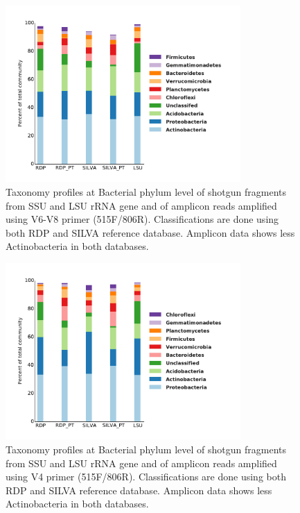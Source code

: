 \documentclass[12pt]{article}
\begin{document}
\begin{figure}[tbph!]
  \centering
  \includegraphics[width=0.8\textwidth]{figs/V6to8_SB1_taxa}

  \caption[Taxonomy profiles at Bacterial phylum level of shotgun
  fragments and of amplicon reads amplified using V6-V8
  primer]{Taxonomy profiles at Bacterial phylum level of shotgun
  fragments from SSU and LSU rRNA gene and of amplicon reads amplified
  using V6-V8 primer (515F/806R). Classifications are done using both
  RDP and SILVA reference database. Amplicon data shows less
  Actinobacteria in both databases.}

  \label{fig:V6to8_SB1_taxa}
\end{figure}

\begin{figure}[tbph!]
  \centering
  \includegraphics[width=0.8\textwidth]{figs/V4_M1_taxa}

  \caption[Taxonomy profiles at Bacterial phylum level of shotgun
  fragments and of amplicon reads amplified using V4 primer]{Taxonomy
  profiles at Bacterial phylum level of shotgun fragments from SSU and
  LSU rRNA gene and of amplicon reads amplified using V4 primer
  (515F/806R). Classifications are done using both RDP and SILVA
  reference database. Amplicon data shows less Actinobacteria in both
  databases.}

  \label{fig:V4_M1_taxa}
\end{figure}
\end{document}
